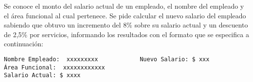 Se conoce el monto del salario actual de un empleado, el nombre del empleado y el área funcional al cual pertenece. Se pide calcular el nuevo salario del empleado sabiendo que obtuvo un incremento del 8\% sobre su salario actual y un descuento de 2,5\% por servicios, informando los resultados con el formato que se especifica a continuación:

\begin{verbatim}
Nombre Empleado:  xxxxxxxxx            Nuevo Salario: $ xxx             
Área Funcional:  xxxxxxxxxxxx
Salario Actual: $ xxxx                     
\end{verbatim}
